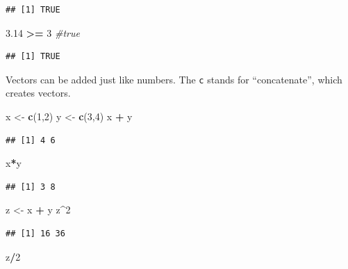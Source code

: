 \documentclass[]{book}
\newenvironment{Shaded}{\begin{snugshade}}{\end{snugshade}}
\newcommand{\CommentTok}[1]{\textcolor[rgb]{0.56,0.35,0.01}{\textit{#1}}}
\newcommand{\DecValTok}[1]{\textcolor[rgb]{0.00,0.00,0.81}{#1}}
\newcommand{\FloatTok}[1]{\textcolor[rgb]{0.00,0.00,0.81}{#1}}
\newcommand{\KeywordTok}[1]{\textcolor[rgb]{0.13,0.29,0.53}{\textbf{#1}}}
\newcommand{\NormalTok}[1]{#1}
\newcommand{\OperatorTok}[1]{\textcolor[rgb]{0.81,0.36,0.00}{\textbf{#1}}}
\newcommand{\StringTok}[1]{\textcolor[rgb]{0.31,0.60,0.02}{#1}}
\begin{document}
\begin{verbatim}
## [1] TRUE
\end{verbatim}

\begin{Shaded}
\begin{Highlighting}[]
\FloatTok{3.14} \OperatorTok{>=}\StringTok{ }\DecValTok{3} \CommentTok{#true}
\end{Highlighting}
\end{Shaded}

\begin{verbatim}
## [1] TRUE
\end{verbatim}

Vectors can be added just like numbers. The \texttt{c} stands for ``concatenate'', which creates vectors.

\begin{Shaded}
\begin{Highlighting}[]
\NormalTok{x <-}\StringTok{ }\KeywordTok{c}\NormalTok{(}\DecValTok{1}\NormalTok{,}\DecValTok{2}\NormalTok{)}
\NormalTok{y <-}\StringTok{ }\KeywordTok{c}\NormalTok{(}\DecValTok{3}\NormalTok{,}\DecValTok{4}\NormalTok{)}
\NormalTok{x }\OperatorTok{+}\StringTok{ }\NormalTok{y}
\end{Highlighting}
\end{Shaded}

\begin{verbatim}
## [1] 4 6
\end{verbatim}

\begin{Shaded}
\begin{Highlighting}[]
\NormalTok{x}\OperatorTok{*}\NormalTok{y}
\end{Highlighting}
\end{Shaded}

\begin{verbatim}
## [1] 3 8
\end{verbatim}

\begin{Shaded}
\begin{Highlighting}[]
\NormalTok{z <-}\StringTok{ }\NormalTok{x }\OperatorTok{+}\StringTok{ }\NormalTok{y}
\NormalTok{z}\OperatorTok{^}\DecValTok{2}
\end{Highlighting}
\end{Shaded}

\begin{verbatim}
## [1] 16 36
\end{verbatim}

\begin{Shaded}
\begin{Highlighting}[]
\NormalTok{z}\OperatorTok{/}\DecValTok{2}
\end{Highlighting}
\end{Shaded}
\end{document}

